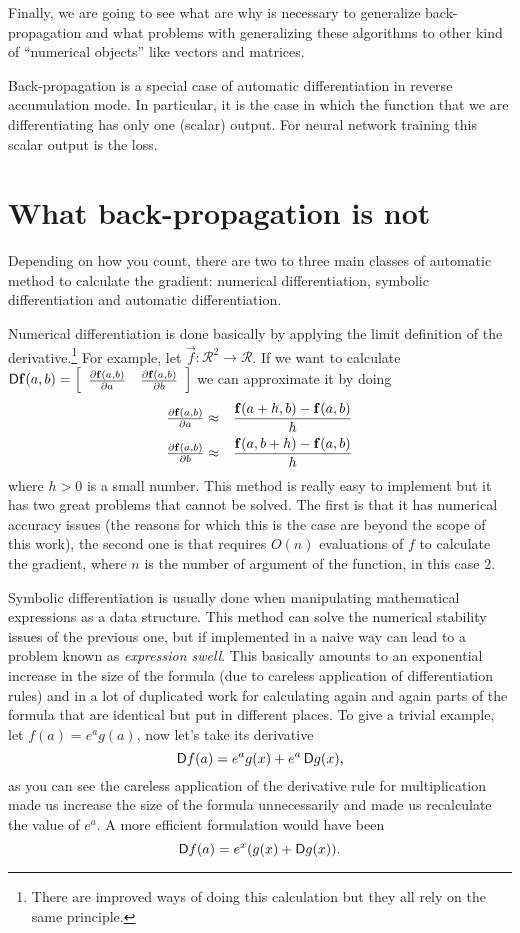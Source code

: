 \documentclass{sapthesis}
\begin{document}
Finally, we are going to see what are why is necessary to generalize
back-propagation and what problems with generalizing these algorithms to other
kind of ``numerical objects'' like vectors and matrices.

Back-propagation is a special case of automatic differentiation in reverse
accumulation mode. In particular, it is the case in which the function that we
are differentiating has only one (scalar) output. For neural network training
this scalar output is the loss.

\section{What back-propagation is not}

Depending on how you count, there are two to three main classes of automatic
method to calculate the gradient: numerical differentiation, symbolic
differentiation and automatic differentiation.

Numerical differentiation is done basically by applying the limit definition of
the derivative.\footnote{There are improved ways of doing this calculation but
they all rely on the same principle.} 
For example, let \(\vec f : \mathcal R^2 \to
\mathcal R\). If  we want to calculate \(\mathop{}\!\mathsf D\mathbf{f}(a,b) =
\left[\begin{array}{cc} \textstyle\frac{\partial\mathbf{f}(a,b)}{\partial a} &
\textstyle\frac{\partial\mathbf{f}(a,b)}{\partial b}\end{array}\right]\) we can approximate
it by doing
\begin{eqnarray*}
    \textstyle\frac{\partial\mathbf{f}(a,b)}{\partial a}
    &\approx& \frac{\mathbf{f}(a + h,b) - \mathbf{f}(a,b)}h \\
    \textstyle\frac{\partial\mathbf{f}(a,b)}{\partial b}
    &\approx& \frac{\mathbf{f}(a,b + h) - \mathbf{f}(a,b)}h
\end{eqnarray*}
where \(h>0\) is a small number. This method is really easy to implement but it
has two great problems that cannot be solved. The first is that it has numerical
accuracy issues (the reasons for which this is the case are beyond the scope of
this work), the second one is that requires \(O(n)\) evaluations of \(f\) to
calculate the gradient, where \(n\) is the number of argument of the function,
in this case 2.

Symbolic differentiation is usually done when manipulating mathematical
expressions as a data structure. This method can solve the numerical stability
issues of the previous one, but if implemented in a naive way can lead to a
problem known as \emph{expression swell}. This basically amounts to an
exponential increase in the size of the formula (due to careless application of
differentiation rules) and in a lot of duplicated work for calculating again and
again parts of the formula that are identical but put in different places. To
give a trivial example, let \(f(a) = e^a g(a)\), now let's take its derivative
\[\mathop{}\!\mathsf D f(a) = e^a g(x) + e^a \mathop{}\!\mathsf D g(x),\] as you can see the careless
application of the derivative rule for multiplication made us increase the size
of the formula unnecessarily and made us recalculate the value of \(e^a\). A
more efficient formulation would have been \[\mathop{}\!\mathsf D f(a) = e^x (g(x) + \mathop{}\!\mathsf D
g(x)).\]
\end{document}
